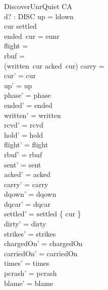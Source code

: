 \documentclass[a4paper,10pt,fleqn]{article}
\begin{document}
\begin{schema}{DiscoverUnrQuiet}
  \Delta CA \\
  d? : DISC
\where
  up = ldown \\
  cur \notin settled \\
  ended~cur = eunr \\
  flight = \emptyset \\
  rbuf = \emptyset \\
  (written~cur \setminus acked~cur) \cup carry = \emptyset \\
  cur' = cur \\
  up' = up \\
  phase' = phase \\
  ended' = ended \\
  written' = written \\
  rcvd' = rcvd \\
  hold' = hold \\
  flight' = flight \\
  rbuf' = rbuf \\
  sent' = sent \\
  acked' = acked \\
  carry' = carry \\
  dqown' = dqown \\
  dqcar' = dqcar \\
  settled' = settled \cup \{ cur \} \\
  dirty' = dirty \\
  strikes' = strikes \\
  chargedOn' = chargedOn \\
  carriedOn' = carriedOn \\
  times' = times \\
  pcrash' = pcrash \\
  blame' = blame
\end{schema}
\end{document}

